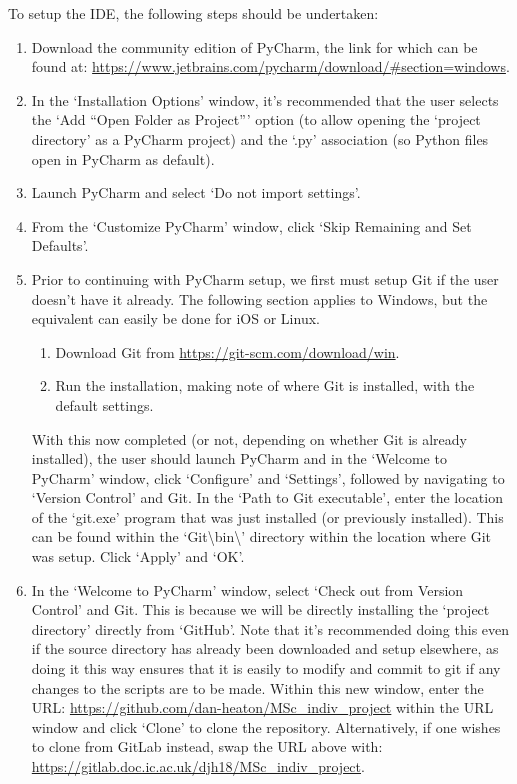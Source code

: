 \documentclass[12pt,twoside]{report}
\begin{document}
To setup the IDE, the following steps should be undertaken:

\begin{enumerate}
	\item Download the community edition of PyCharm, the link for which can be found at: \url{https://www.jetbrains.com/pycharm/download/#section=windows}.
	\item In the ‘Installation Options’ window, it’s recommended that the user selects the ‘Add “Open Folder as Project”’ option (to allow opening the ‘project directory’ as a PyCharm project) and the ‘.py’ association (so Python files open in PyCharm as default).
	\item Launch PyCharm and select ‘Do not import settings’.
	\item From the ‘Customize PyCharm’ window, click ‘Skip Remaining and Set Defaults’.
	\item Prior to continuing with PyCharm setup, we first must setup Git if the user doesn’t have it already. The following section applies to Windows, but the equivalent can easily be done for iOS or Linux.
	\begin{enumerate}
		\item Download Git from \url{https://git-scm.com/download/win}.
		\item Run the installation, making note of where Git is installed, with the default settings.
	\end{enumerate}
	With this now completed (or not, depending on whether Git is already installed), the user should launch PyCharm and in the ‘Welcome to PyCharm’ window, click ‘Configure’ and ‘Settings’, followed by navigating to ‘Version Control’ and Git. In the ‘Path to Git executable’, enter the location of the ‘git.exe’ program that was just installed (or previously installed). This can be found within the ‘Git\textbackslash bin\textbackslash’ directory within the location where Git was setup. Click ‘Apply’ and ‘OK’.
	\item In the ‘Welcome to PyCharm’ window, select ‘Check out from Version Control’ and Git. This is because we will be directly installing the ‘project directory’ directly from ‘GitHub’. Note that it’s recommended doing this even if the source directory has already been downloaded and setup elsewhere, as doing it this way ensures that it is easily to modify and commit to git if any changes to the scripts are to be made. Within this new window, enter the URL: \url{https://github.com/dan-heaton/MSc_indiv_project} within the URL window and click ‘Clone’ to clone the repository. Alternatively, if one wishes to clone from GitLab instead, swap the URL above with: \url{https://gitlab.doc.ic.ac.uk/djh18/MSc_indiv_project}.

\end{enumerate}
\end{document}
